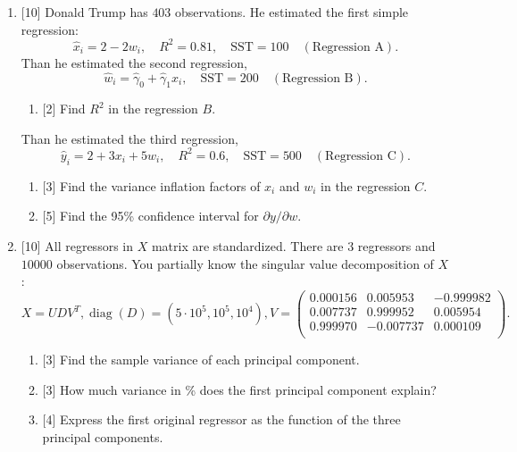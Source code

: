 \documentclass[12pt]{article}
\DeclareMathOperator{\diag}{diag}
\newcommand{\SST}{\text{SST}}
\begin{document}
\begin{enumerate}
    \item {[10]} Donald Trump has $403$ observations. 
    He estimated the first simple regression:
    \[
    \hat x_i = 2 - 2 w_i, \quad R^2 = 0.81, \quad \SST = 100 \quad (\text{Regression A}).
    \]
    Than he estimated the second regression,
    \[
    \hat w_i = \hat \gamma_0 + \hat\gamma_1 x_i, \quad \SST = 200 \quad (\text{Regression B}).
    \]
    \begin{enumerate}
        \item {[2]} Find $R^2$ in the regression $B$.
    \end{enumerate}
    Than he estimated the third regression, 
    \[
    \hat y_i = 2 + 3x_i + 5w_i, \quad R^2 = 0.6, \quad \SST = 500 \quad (\text{Regression C}).
    \]
    \begin{enumerate}[resume]
        \item {[3]} Find the variance inflation factors of $x_i$ and $w_i$ in the regression $C$.
        \item {[5]} Find the 95\% confidence interval for $\partial y/\partial w$.
    \end{enumerate}
    \newpage 


    \item  {[10]} All regressors in $X$ matrix are standardized. 
    There are $3$ regressors and $10000$ observations. 
    You partially know the singular value decomposition of $X$:
    \[
    X = UDV^T, \diag(D) = (5 \cdot 10^5, 10^5, 10^4),
    V = \begin{pmatrix}
        0.000156 & 0.005953 & -0.999982 \\ 
        0.007737 & 0.999952 & 0.005954 \\ 
        0.999970 & -0.007737 & 0.000109 \\ 
        \end{pmatrix}.
    \]
    \begin{enumerate}
        \item {[3]} Find the sample variance of each principal component.
        \item {[3]} How much variance in \% does the first principal component explain?
        \item {[4]} Express the first original regressor as the function of the three principal components.
    \end{enumerate}


    

\end{enumerate}
\end{document}
